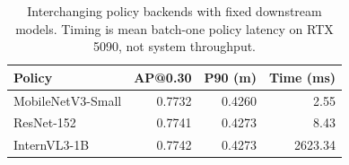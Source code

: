\begin{table}[t]
\centering\small
\caption{Interchanging policy backends with fixed downstream models. Timing is mean batch-one policy latency on RTX 5090, not system throughput.}
\label{tab:policy-compact}
\setlength{\tabcolsep}{3pt}
\begin{tabular*}{\columnwidth}{@{\extracolsep{\fill}}lrrr@{}}
\toprule
Policy & AP@0.30 & P90 (m)&Time (ms)\\
\midrule
MobileNetV3-Small &0.7732&0.4260&2.55\\
ResNet-152 &0.7741&0.4273&8.43\\
InternVL3-1B &0.7742&0.4273&2623.34\\
\bottomrule
\end{tabular*}
\end{table}
